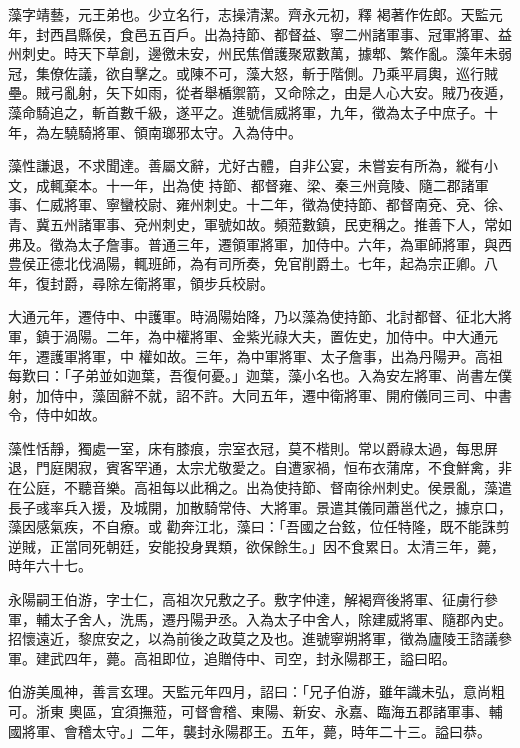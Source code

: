 \begin{pinyinscope}
 藻字靖藝，元王弟也。少立名行，志操清潔。齊永元初，釋
 褐著作佐郎。天監元年，封西昌縣侯，食邑五百戶。出為持節、都督益、寧二州諸軍事、冠軍將軍、益州刺史。時天下草創，邊徼未安，州民焦僧護聚眾數萬，據郫、繁作亂。藻年未弱冠，集僚佐議，欲自擊之。或陳不可，藻大怒，斬于階側。乃乘平肩輿，巡行賊壘。賊弓亂射，矢下如雨，從者舉楯禦箭，又命除之，由是人心大安。賊乃夜遁，藻命騎追之，斬首數千級，遂平之。進號信威將軍，九年，徵為太子中庶子。十年，為左驍騎將軍、領南瑯邪太守。入為侍中。



 藻性謙退，不求聞達。善屬文辭，尤好古體，自非公宴，未嘗妄有所為，縱有小文，成輒棄本。十一年，出為使
 持節、都督雍、梁、秦三州竟陵、隨二郡諸軍事、仁威將軍、寧蠻校尉、雍州刺史。十二年，徵為使持節、都督南兗、兗、徐、青、冀五州諸軍事、兗州刺史，軍號如故。頻蒞數鎮，民吏稱之。推善下人，常如弗及。徵為太子詹事。普通三年，遷領軍將軍，加侍中。六年，為軍師將軍，與西豊侯正德北伐渦陽，輒班師，為有司所奏，免官削爵土。七年，起為宗正卿。八年，復封爵，尋除左衛將軍，領步兵校尉。



 大通元年，遷侍中、中護軍。時渦陽始降，乃以藻為使持節、北討都督、征北大將軍，鎮于渦陽。二年，為中權將軍、金紫光祿大夫，置佐史，加侍中。中大通元年，遷護軍將軍，中
 權如故。三年，為中軍將軍、太子詹事，出為丹陽尹。高祖每歎曰：「子弟並如迦葉，吾復何憂。」迦葉，藻小名也。入為安左將軍、尚書左僕射，加侍中，藻固辭不就，詔不許。大同五年，遷中衛將軍、開府儀同三司、中書令，侍中如故。



 藻性恬靜，獨處一室，床有膝痕，宗室衣冠，莫不楷則。常以爵祿太過，每思屏退，門庭閑寂，賓客罕通，太宗尤敬愛之。自遭家禍，恒布衣蒲席，不食鮮禽，非在公庭，不聽音樂。高祖每以此稱之。出為使持節、督南徐州刺史。侯景亂，藻遣長子彧率兵入援，及城開，加散騎常侍、大將軍。景遣其儀同蕭邕代之，據京口，藻因感氣疾，不自療。或
 勸奔江北，藻曰：「吾國之台鉉，位任特隆，既不能誅剪逆賊，正當同死朝廷，安能投身異類，欲保餘生。」因不食累日。太清三年，薨，時年六十七。



 永陽嗣王伯游，字士仁，高祖次兄敷之子。敷字仲達，解褐齊後將軍、征虜行參軍，輔太子舍人，洗馬，遷丹陽尹丞。入為太子中舍人，除建威將軍、隨郡內史。招懷遠近，黎庶安之，以為前後之政莫之及也。進號寧朔將軍，徵為廬陵王諮議參軍。建武四年，薨。高祖即位，追贈侍中、司空，封永陽郡王，謚曰昭。



 伯游美風神，善言玄理。天監元年四月，詔曰：「兄子伯游，雖年識未弘，意尚粗可。浙東
 奧區，宜須撫蒞，可督會稽、東陽、新安、永嘉、臨海五郡諸軍事、輔國將軍、會稽太守。」二年，襲封永陽郡王。五年，薨，時年二十三。謚曰恭。




\end{pinyinscope}
